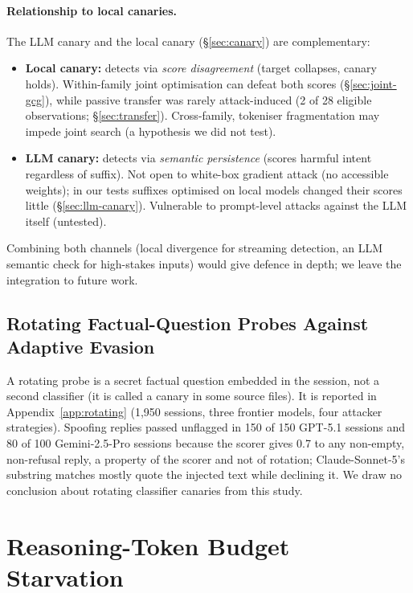 \documentclass{article}
\begin{document}
\paragraph{Relationship to local canaries.} The LLM canary and the local canary (\S\ref{sec:canary}) are complementary:
\begin{itemize}
\item \textbf{Local canary:} detects via \emph{score disagreement} (target collapses, canary holds). Within-family joint optimisation can defeat both scores (\S\ref{sec:joint-gcg}), while passive transfer was rarely attack-induced (2 of 28 eligible observations; \S\ref{sec:transfer}). Cross-family, tokeniser fragmentation may impede joint search (a hypothesis we did not test).
\item \textbf{LLM canary:} detects via \emph{semantic persistence} (scores harmful intent regardless of suffix). Not open to white-box gradient attack (no accessible weights); in our tests suffixes optimised on local models changed their scores little (\S\ref{sec:llm-canary}). Vulnerable to prompt-level attacks against the LLM itself (untested).
\end{itemize}
Combining both channels (local divergence for streaming detection, an LLM semantic check for high-stakes inputs) would give defence in depth; we leave the integration to future work.


\subsection{Rotating Factual-Question Probes Against Adaptive Evasion}
\label{sec:rotating-canary-eval}

A rotating probe is a secret factual question embedded in the session, not a second classifier (it is called a canary in some source files). It is reported in Appendix~\ref{app:rotating} (1,950 sessions, three frontier models, four attacker strategies). Spoofing replies passed unflagged in 150 of 150 GPT-5.1 sessions and 80 of 100 Gemini-2.5-Pro sessions because the scorer gives 0.7 to any non-empty, non-refusal reply, a property of the scorer and not of rotation; Claude-Sonnet-5's substring matches mostly quote the injected text while declining it. We draw no conclusion about rotating classifier canaries from this study.


\section{Reasoning-Token Budget Starvation}
\label{sec:token-starvation}
\end{document}
